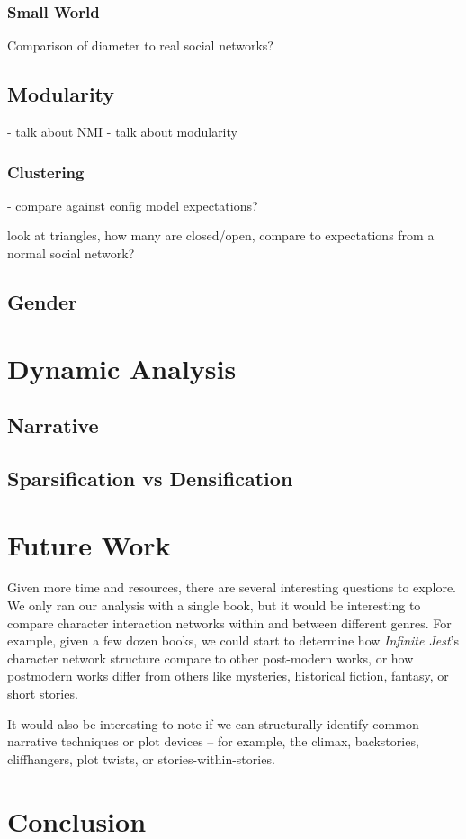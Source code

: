\documentclass[sigconf]{acmart}
\newcommand{\infinitejest}{{\em Infinite Jest}\xspace}
\begin{document}
\subsubsection{Small World}
Comparison of diameter to real social networks?

\subsection{Modularity}

- talk about NMI
- talk about modularity

\subsubsection{Clustering}
 - compare against config model expectations?

 look at triangles, how many are closed/open, compare to expectations from a normal social network?

\subsection{Gender}

\section{Dynamic Analysis}

\subsection{Narrative}

\subsection{Sparsification vs Densification}

\section{Future Work}

Given more time and resources, there are several interesting questions to explore. We only ran our analysis with a single book, but it would be interesting to compare character interaction networks within and between different genres. For example, given a few dozen books, we could start to determine how \infinitejest's character network structure compare to other post-modern works, or how postmodern works differ from others like mysteries, historical fiction, fantasy, or short stories.

It would also be interesting to note if we can structurally identify common narrative techniques or plot devices -- for example, the climax, backstories, cliffhangers, plot twists, or stories-within-stories.

\section{Conclusion}



\end{document}
